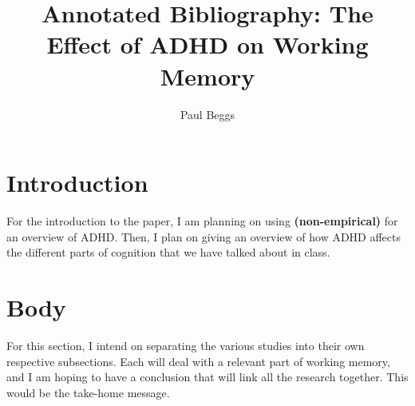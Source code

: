 \documentclass[stu]{apa7}
\title{Annotated Bibliography: The Effect of ADHD on Working Memory}
\author{Paul Beggs}
\begin{document}
\maketitle

\section{Introduction}

For the introduction to the paper, I am planning on using \textcite{faraone_attention-deficithyperactivity_2015} \textbf{(non-empirical)} for an overview of ADHD. Then, I plan on giving an overview of how ADHD affects the different parts of cognition that we have talked about in class. 

\section{Body}

For this section, I intend on separating the various studies into their own respective subsections. Each will deal with a relevant part of working memory, and I am hoping to have a conclusion that will link all the research together. This would be the take-home message.
\end{document}
